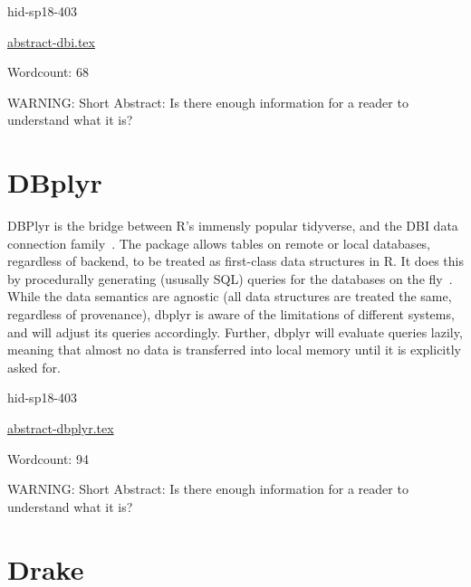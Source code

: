 \begin{IU}

hid-sp18-403

\href{https://github.com/cloudmesh-community/hid-sp18-403/blob/master//technology/abstract-dbi.tex}{abstract-dbi.tex}

 

Wordcount: 68

WARNING: Short Abstract: Is there enough information for a reader to understand what it is?

\end{IU}

\section{DBplyr}

DBPlyr is the bridge between R’s immensly popular tidyverse, and the
DBI data connection family~\cite{hid-sp18-403-tidy-dbplyr}. The package allows
tables on remote or local databases, regardless of backend, to be
treated as first-class data structures in R. It does this by
procedurally generating (ususally SQL) queries for the databases on
the fly~\cite{hid-sp18-403-R-dbplyr}. While the data semantics are
agnostic (all data structures are treated the same, regardless of
provenance), dbplyr is aware of the limitations of different systems,
and will adjust its queries accordingly. Further, dbplyr will evaluate
queries lazily, meaning that almost no data is transferred into local
memory until it is explicitly asked for.


\begin{IU}

hid-sp18-403

\href{https://github.com/cloudmesh-community/hid-sp18-403/blob/master//technology/abstract-dbplyr.tex}{abstract-dbplyr.tex}

 

Wordcount: 94

WARNING: Short Abstract: Is there enough information for a reader to understand what it is?

\end{IU}

\section{Drake}

